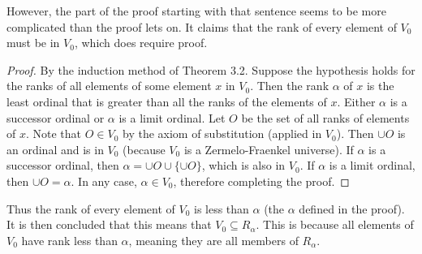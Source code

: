 \documentclass{article}
\theoremstyle{definition}
\begin{document}
However, the part of the proof starting with that sentence seems to be more complicated than the proof lets on. It claims that the 
rank of every element of $V_0$ must be in $V_0$, which does require proof.
\begin{proof}
By the induction method of Theorem 3.2. Suppose the hypothesis holds for the ranks of all elements of some element $x$ in $V_0$. 
Then the rank $\alpha$ of $x$ is the least ordinal that is greater than all the ranks of the elements of $x$. Either $\alpha$ is a 
successor ordinal or $\alpha$ is a limit ordinal. Let $O$ be the set of all ranks of elements of $x$. 
Note that $O\in V_0$ by the axiom of substitution (applied in $V_0$). Then $\cup O$ is an ordinal and 
is in $V_0$ (because $V_0$ is a Zermelo-Fraenkel universe). 
If $\alpha$ is a successor ordinal, then $\alpha=\cup O\cup\{\cup O\}$, which is also in $V_0$. If $\alpha$ is a limit ordinal, then 
$\cup O=\alpha$. In any case, $\alpha\in V_0$, therefore completing the proof.
\end{proof} 
Thus the rank of every element of $V_0$ is less than $\alpha$ (the $\alpha$ defined in the proof). It is then concluded that this means 
that $V_0\subseteq R_\alpha$. This is because all elements of $V_0$ have rank less than $\alpha$, meaning they are all members of $R_\alpha$.
\end{document}
